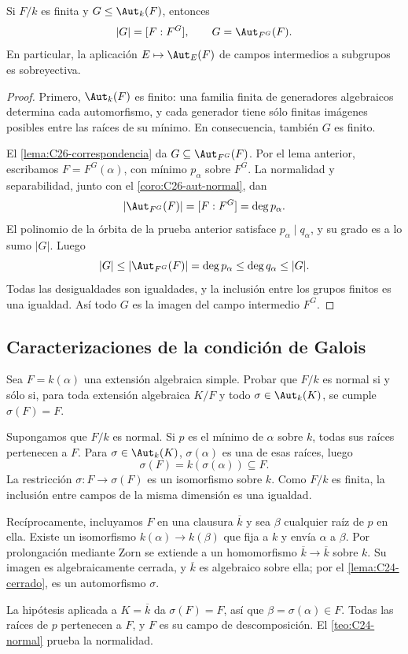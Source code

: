 \begin{prop}\label{prop:C27-artin}
Si $F/k$ es finita y $G\leq\Aut_k(F)$, entonces
\[
|G|=[F:F^G],\qquad G=\Aut_{F^G}(F).
\]
En particular, la aplicación $E\mapsto\Aut_E(F)$ de campos intermedios a subgrupos es sobreyectiva.
\end{prop}
\begin{proof}
Primero, $\Aut_k(F)$ es finito: una familia finita de generadores algebraicos determina cada automorfismo, y cada generador tiene sólo finitas imágenes posibles entre las raíces de su mínimo. En consecuencia, también $G$ es finito.

El \cref{lema:C26-correspondencia} da $G\subseteq\Aut_{F^G}(F)$. Por el lema anterior, escribamos $F=F^G(\alpha)$, con mínimo $p_\alpha$ sobre $F^G$. La normalidad y separabilidad, junto con el \cref{coro:C26-aut-normal}, dan
\[
|\Aut_{F^G}(F)|=[F:F^G]=\deg p_\alpha.
\]
El polinomio de la órbita de la prueba anterior satisface $p_\alpha\mid q_\alpha$, y su grado es a lo sumo $|G|$. Luego
\[
|G|\leq|\Aut_{F^G}(F)|=\deg p_\alpha
\leq\deg q_\alpha\leq|G|.
\]
Todas las desigualdades son igualdades, y la inclusión entre los grupos finitos es una igualdad. Así todo $G$ es la imagen del campo intermedio $F^G$.
\end{proof}

\subsection{Caracterizaciones de la condición de Galois}
\begin{ejer}\label{ejer:C27-normal-invariante}
Sea $F=k(\alpha)$ una extensión algebraica simple. Probar que $F/k$ es normal si y sólo si, para toda extensión algebraica $K/F$ y todo $\sigma\in\Aut_k(K)$, se cumple $\sigma(F)=F$.
\end{ejer}
\begin{sol}
Supongamos que $F/k$ es normal. Si $p$ es el mínimo de $\alpha$ sobre $k$, todas sus raíces pertenecen a $F$. Para $\sigma\in\Aut_k(K)$, $\sigma(\alpha)$ es una de esas raíces, luego
\[
\sigma(F)=k(\sigma(\alpha))\subseteq F.
\]
La restricción $\sigma:F\to\sigma(F)$ es un isomorfismo sobre $k$. Como $F/k$ es finita, la inclusión entre campos de la misma dimensión es una igualdad.

Recíprocamente, incluyamos $F$ en una clausura $\overline k$ y sea $\beta$ cualquier raíz de $p$ en ella. Existe un isomorfismo $k(\alpha)\to k(\beta)$ que fija a $k$ y envía $\alpha$ a $\beta$. Por prolongación mediante Zorn se extiende a un homomorfismo $\overline k\to\overline k$ sobre $k$. Su imagen es algebraicamente cerrada, y $\overline k$ es algebraico sobre ella; por el \cref{lema:C24-cerrado}, es un automorfismo $\sigma$.

La hipótesis aplicada a $K=\overline k$ da $\sigma(F)=F$, así que $\beta=\sigma(\alpha)\in F$. Todas las raíces de $p$ pertenecen a $F$, y $F$ es su campo de descomposición. El \cref{teo:C24-normal} prueba la normalidad.
\end{sol}

